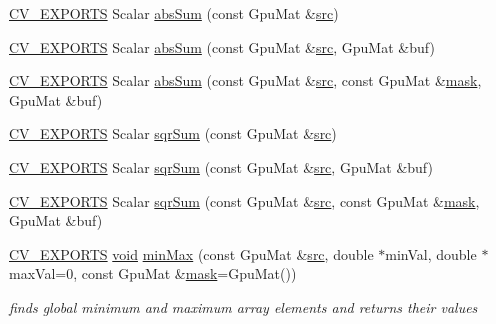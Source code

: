\begin{DoxyCompactItemize}
\item 
\hyperlink{core_2types__c_8h_a1bf9f0e121b54272da02379cfccd0a2b}{C\-V\-\_\-\-E\-X\-P\-O\-R\-T\-S} Scalar \hyperlink{namespacecv_1_1gpu_a06cb4f451f35058cb711e6deca0f4192}{abs\-Sum} (const Gpu\-Mat \&\hyperlink{legacy_8hpp_a371cd109b74033bc4366f584edd3dacc}{src})
\item 
\hyperlink{core_2types__c_8h_a1bf9f0e121b54272da02379cfccd0a2b}{C\-V\-\_\-\-E\-X\-P\-O\-R\-T\-S} Scalar \hyperlink{namespacecv_1_1gpu_a340d22205f757c76bd2ef64abb8f3879}{abs\-Sum} (const Gpu\-Mat \&\hyperlink{legacy_8hpp_a371cd109b74033bc4366f584edd3dacc}{src}, Gpu\-Mat \&buf)
\item 
\hyperlink{core_2types__c_8h_a1bf9f0e121b54272da02379cfccd0a2b}{C\-V\-\_\-\-E\-X\-P\-O\-R\-T\-S} Scalar \hyperlink{namespacecv_1_1gpu_a6d13c3f22ef5ae47c977b447bb6bff95}{abs\-Sum} (const Gpu\-Mat \&\hyperlink{legacy_8hpp_a371cd109b74033bc4366f584edd3dacc}{src}, const Gpu\-Mat \&\hyperlink{tracking_8hpp_a6b13ecd2fd6ec7ad422f1d7863c3ad19}{mask}, Gpu\-Mat \&buf)
\item 
\hyperlink{core_2types__c_8h_a1bf9f0e121b54272da02379cfccd0a2b}{C\-V\-\_\-\-E\-X\-P\-O\-R\-T\-S} Scalar \hyperlink{namespacecv_1_1gpu_a37ab134ef3e842c914197089d705c384}{sqr\-Sum} (const Gpu\-Mat \&\hyperlink{legacy_8hpp_a371cd109b74033bc4366f584edd3dacc}{src})
\item 
\hyperlink{core_2types__c_8h_a1bf9f0e121b54272da02379cfccd0a2b}{C\-V\-\_\-\-E\-X\-P\-O\-R\-T\-S} Scalar \hyperlink{namespacecv_1_1gpu_ae4533d28ceab158bc08829717045b079}{sqr\-Sum} (const Gpu\-Mat \&\hyperlink{legacy_8hpp_a371cd109b74033bc4366f584edd3dacc}{src}, Gpu\-Mat \&buf)
\item 
\hyperlink{core_2types__c_8h_a1bf9f0e121b54272da02379cfccd0a2b}{C\-V\-\_\-\-E\-X\-P\-O\-R\-T\-S} Scalar \hyperlink{namespacecv_1_1gpu_a1c86933fb7d71d3d03aa17ef2c23a65d}{sqr\-Sum} (const Gpu\-Mat \&\hyperlink{legacy_8hpp_a371cd109b74033bc4366f584edd3dacc}{src}, const Gpu\-Mat \&\hyperlink{tracking_8hpp_a6b13ecd2fd6ec7ad422f1d7863c3ad19}{mask}, Gpu\-Mat \&buf)
\item 
\hyperlink{core_2types__c_8h_a1bf9f0e121b54272da02379cfccd0a2b}{C\-V\-\_\-\-E\-X\-P\-O\-R\-T\-S} \hyperlink{legacy_8hpp_a8bb47f092d473522721002c86c13b94e}{void} \hyperlink{namespacecv_1_1gpu_a848e26ca95231f8902675855caf8a567}{min\-Max} (const Gpu\-Mat \&\hyperlink{legacy_8hpp_a371cd109b74033bc4366f584edd3dacc}{src}, double $\ast$min\-Val, double $\ast$max\-Val=0, const Gpu\-Mat \&\hyperlink{tracking_8hpp_a6b13ecd2fd6ec7ad422f1d7863c3ad19}{mask}=Gpu\-Mat())
\begin{DoxyCompactList}\small\item\em finds global minimum and maximum array elements and returns their values \end{DoxyCompactList}\item 

\end{DoxyCompactItemize}
